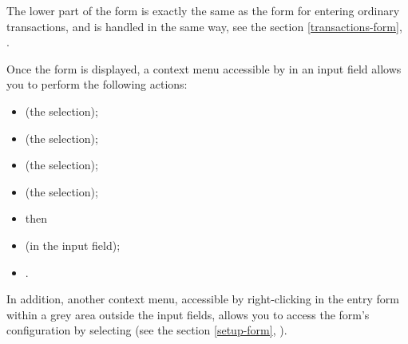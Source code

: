 The lower part of the form is exactly the same as the form for entering ordinary transactions, and is handled in the same way, see the section \vref{transactions-form}, .

Once the form is displayed, a context menu accessible by  in an input field allows you to perform the following actions:

\begin{itemize}
	\item {} (the selection);
	\item {} (the selection);
	\item {} (the selection);
	\item {} (the selection);
	\item[]\hspace{-12pt} then
	\item {} (in the input field);
	\item {}.
\end{itemize}

In addition, another context menu, accessible by right-clicking in the entry form within a grey area outside the input fields, allows you to access the form’s configuration by selecting  (see the section \vref{setup-form}, ).

